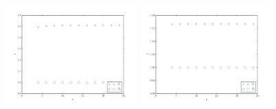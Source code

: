 \documentclass{marine_2015}
\begin{document}
 \begin{figure}[ht]
 \centering
 \includegraphics[width=0.45\textwidth]{img/Schur_precond_shen_cond}
 \includegraphics[width=0.45\textwidth]{img/Schur_precond_sine_cond}\\
 \caption{}
 \label{fig:Schur}
 \end{figure}
 
\end{document}

